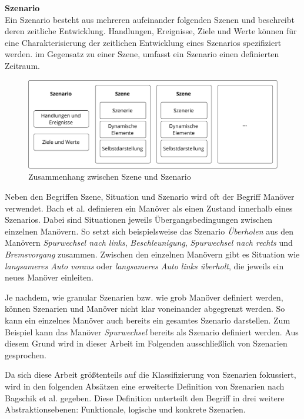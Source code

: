 \vspace{0,3cm}
\noindent\textbf{Szenario}\\
Ein Szenario besteht aus mehreren aufeinander folgenden Szenen und beschreibt deren zeitliche Entwicklung. Handlungen, Ereignisse, Ziele und Werte können für eine Charakterisierung der zeitlichen Entwicklung eines Szenarios spezifiziert werden. im Gegensatz zu einer Szene, umfasst ein Szenario einen definierten Zeitraum.

\vspace{0,3cm}

\begin{figure}[h]
\centering
\includegraphics[scale=0.7]{images/relation_sc_sc.pdf}
\caption[Zusammenhang zwischen Szene und Szenario]{Zusammenhang zwischen Szene und Szenario \cite{ulbrich2015defining}}
\label{fig_relation_sc_sc}
\end{figure}

Neben den Begriffen Szene, Situation und Szenario wird oft der Begriff Manöver verwendet. Bach et al. \cite{bach2016model} definieren ein Manöver als einen Zustand innerhalb eines Szenarios. Dabei sind Situationen jeweils Übergangsbedingungen zwischen einzelnen Manövern. So setzt sich beispielsweise das Szenario \textit{Überholen} aus den Manövern \textit{Spurwechsel nach links}, \textit{Beschleunigung}, \textit{Spurwechsel nach rechts} und \textit{Bremsvorgang} zusammen. Zwischen den einzelnen Manövern gibt es Situation wie \textit{langsameres Auto voraus} oder \textit{langsameres Auto links überholt}, die jeweils ein neues Manöver einleiten.

Je nachdem, wie granular Szenarien bzw. wie grob Manöver definiert werden, können Szenarien und Manöver nicht klar voneinander abgegrenzt werden. So kann ein einzelnes Manöver auch bereits ein gesamtes Szenario darstellen. Zum Beispiel kann das Manöver \textit{Spurwechsel} bereits als Szenario definiert werden. Aus diesem Grund wird in dieser Arbeit im Folgenden ausschließlich von Szenarien gesprochen.

Da sich diese Arbeit größtenteils auf die Klassifizierung von Szenarien fokussiert, wird in den folgenden Absätzen eine erweiterte Definition von Szenarien nach Bagschik et al. \cite{bagschik2017szenarien} gegeben. Diese Definition unterteilt den Begriff in drei weitere Abstraktionsebenen: Funktionale, logische und konkrete Szenarien.

